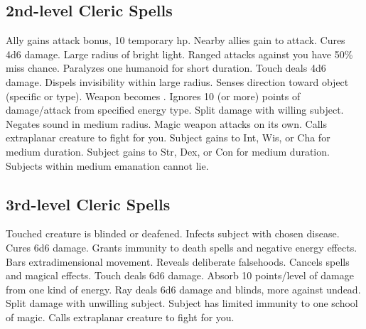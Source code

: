 \subsection{2nd-level Cleric Spells}
\begin{spelllist}
   Ally gains  attack bonus, 10 temporary hp.
   Nearby allies gain  to attack.
   Cures 4d6 damage.
   Large radius of bright light.
   Ranged attacks against you have 50\% miss chance.
   Paralyzes one humanoid for short duration.
   Touch deals 4d6 damage.
   Dispels invisibility within large radius.
   Senses direction toward object (specific or type).
   Weapon becomes .
   Ignores 10 (or more) points of damage/attack from specified energy type.
    Split damage with willing subject.
   Negates sound in medium radius.
   Magic weapon attacks on its own.
   Calls extraplanar creature to fight for you.
   Subject gains  to Int, Wis, or Cha for medium duration.
   Subject gains  to Str, Dex, or Con for medium duration.
   Subjects within medium emanation cannot lie.
\end{spelllist}

\subsection{3rd-level Cleric Spells}
\begin{spelllist}
   Touched creature is blinded or deafened.
   Infects subject with chosen disease.
   Cures 6d6 damage.
   Grants immunity to death spells and negative energy effects.
   Bars extradimensional movement.
   Reveals deliberate falsehoods.
   Cancels spells and magical effects.
   Touch deals 6d6 damage.
   Absorb 10 points/level of damage from one kind of energy.
   Ray deals 6d6 damage and blinds, more against undead.
    Split damage with unwilling subject.
   Subject has limited immunity to one school of magic. 
   Calls extraplanar creature to fight for you.
\end{spelllist}

